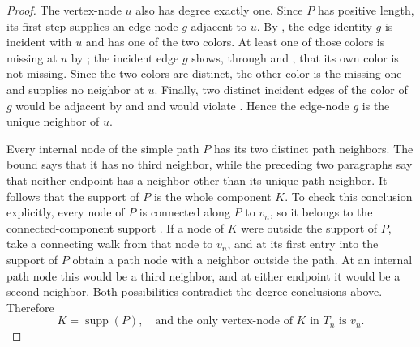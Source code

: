 \begin{proof}
The vertex-node \(u\) also has degree exactly one.  Since \(P\) has
positive length, its first step supplies an edge-node \(g\) adjacent to
\(u\).  By , the edge identity \(g\) is
incident with \(u\) and has one of the two colors.  At least one of those
colors is missing at \(u\) by ; the incident edge
\(g\) shows, through  and
, that its own color is not missing.  Since the
two colors are distinct, the other color is the missing one and supplies
no neighbor at \(u\).  Finally, two distinct incident edges of the color
of \(g\) would be adjacent by  and
 and would violate
.  Hence the edge-node \(g\) is the unique
neighbor of \(u\).

Every internal node of the simple path \(P\) has its two distinct path
neighbors.  The bound  says
that it has no third neighbor, while the preceding two paragraphs say
that neither endpoint has a neighbor other than its unique path neighbor.
It follows that the support of \(P\) is the whole component \(K\).  To
check this conclusion explicitly, every node of \(P\) is connected along
\(P\) to \(v_n\), so it belongs to the connected-component support
.  If a node of \(K\) were outside the support
of \(P\), take a connecting walk from that node to \(v_n\), and at its
first entry into the support of \(P\) obtain a path node with a neighbor
outside the path.  At an internal path node this would be a third
neighbor, and at either endpoint it would be a second neighbor.  Both
possibilities contradict the degree conclusions above.  Therefore
\[
 K=\operatorname{supp}(P),
 \quad\text{and the only vertex-node of }K\text{ in }T_n
 \text{ is }v_n.                                                \tag{11}
\]


\end{proof}
